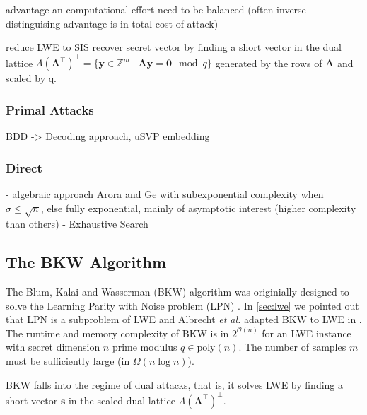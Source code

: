 advantage an computational effort need to be balanced (often inverse distinguising advantage is in total cost of attack)

reduce LWE to SIS
recover secret vector by finding a short vector in the dual lattice $\Lambda(\mathbf{A}^\intercal)^{\perp} = \{ \mathbf{y} \in \mathbb{Z}^m \mid \mathbf{A} \mathbf{y} = \mathbf{0} \mod q\}$ generated by the rows of $\mathbf{A}$ and scaled by q.

\subsubsection{Primal Attacks}
BDD -> Decoding approach, uSVP embedding


\subsubsection{Direct} %

- algebraic approach Arora and Ge with subexponential complexity when $\sigma \leq \sqrt{n}$, else fully exponential, mainly of asymptotic interest (higher complexity than others)
- Exhaustive Search



\subsection[The BKW Algorithm]{The BKW Algorithm \cite{BKW03}}
The Blum, Kalai and Wasserman (BKW) algorithm was originially designed to solve the Learning Parity with Noise problem (LPN) \cite{BKW03}. In \cref{sec:lwe} we pointed out that LPN is a subproblem of LWE and Albrecht \textit{et al.} adapted BKW to LWE in \cite{ACFFP15a}. The runtime and memory complexity of BKW is in $2^{\mathcal{O}(n)}$ for an LWE instance with secret dimension $n$ prime modulus $q \in \text{poly}(n)$. The number of samples $m$ must be sufficiently large (in $\mathcal{\Omega}(n \log n)$). %

BKW falls into the regime of dual attacks, that is, it solves LWE by finding a short vector $\mathbf{s}$ in the scaled dual lattice $\Lambda(\mathbf{A}^\intercal)^{\perp}$.


